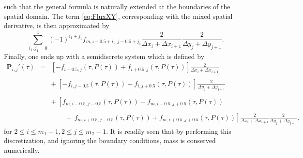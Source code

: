\documentclass[10pt]{article}
\begin{document}
such that the general formula is naturally extended at the boundaries of the spatial domain.
The term \eqref{eq:FluxXY}, corresponding with the mixed spatial derivative, is then approximated by
$$ \sum_{i_{1},j_{1} = 0}^{1} (-1)^{i_{1}+j_{1}} f_{m,i-0.5 + i_{1},j-0.5+j_{1}} \frac{2}{\Delta x_{i}+\Delta x_{i+1}}\frac{2}{\Delta y_{j}+\Delta y_{j+1}}. $$
Finally, one ends up with a semidiscrete system which is defined by
\begin{eqnarray}
\boldsymbol{P}_{i,j}'(\tau) &=&  \left[ -f_{i-0.5,j}(\tau,P(\tau)) + f_{i+0.5,j}(\tau,P(\tau))\right]\frac{2}{\Delta x_{i} + \Delta x_{i+1}} \label{eq:2DDiscretizationGeneral} \\ \nonumber \\
&& + \ \left[ -f_{i,j-0.5}(\tau,P(\tau)) + f_{i,j+0.5}(\tau,P(\tau))\right]\frac{2}{\Delta y_{j} + \Delta y_{j+1}} \nonumber \\ \nonumber \\
&& + \ \left[ f_{m,i-0.5,j-0.5}(\tau,P(\tau)) - f_{m,i-0.5,j+0.5}(\tau,P(\tau))\right. \nonumber \\ \nonumber \\
&& \left. \qquad - \ f_{m,i+0.5,j-0.5}(\tau,P(\tau)) + f_{m,i+0.5,j+0.5}(\tau,P(\tau)) \right] \frac{2}{\Delta x_{i}+\Delta x_{i+1}}\frac{2}{\Delta y_{j}+\Delta y_{j+1}}, \nonumber
\end{eqnarray}
for $2 \le i \leq m_{1}-1, 2 \le j \le m_{2}-1$.
It is readily seen that by performing this discretization, and ignoring the boundary conditions, mass is conserved numerically.
\end{document}
